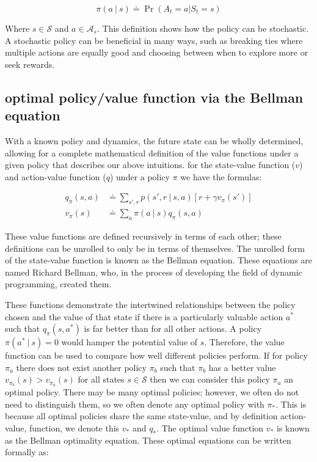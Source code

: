 \documentclass[]{final_report}
\begin{document}
\begin{equation}
  \pi(a \ |\ s) \doteq \Pr(A_t = a | S_t = s)
  \label{eqn:policy-def}
\end{equation}



Where $s \in \mathcal{S}$ and $a \in \mathcal{A}_s$. This definition shows how the policy can be stochastic. A stochastic policy can be beneficial in many ways, such as breaking ties where multiple actions are equally good and choosing between when to explore more or seek rewards. 

\subsection{optimal policy/value function via the Bellman equation}

With a known policy and dynamics, the future state can be wholly determined, allowing for a complete mathematical definition of the value functions under a given policy that describes our above intuitions. for the state-value function ($v$) and action-value function ($q$) under a policy $\pi$ we have the formulas:


\begin{align}
  q_\pi(s,a) & \doteq \sum_{s',r}p(s',r\ |\ s, a)[r + \gamma v_\pi(s')]\label{eqn:q-def} \\
  v_\pi(s)   & \doteq \sum_a \pi(a\ |\ s) q_\pi(s,a) \label{eqn:v-def}
\end{align}

These value functions are defined recursively in terms of each other; these definitions can be unrolled to only be in terms of themselves. The unrolled form of the state-value function is known as the Bellman equation. These equations are named Richard Bellman, who, in the process of developing the field of dynamic programming, created them\cite{bellman1957}.   

These functions demonstrate the intertwined relationships between the policy chosen and the value of that state if there is a particularly valuable action $a^\ast$ such that $q_\pi(s,a^\ast)$ is far better than for all other actions. A policy $\pi(a^\ast\ |\ s) = 0$ would hamper the potential value of $s$. Therefore, the value function can be used to compare how well different policies perform. If for policy $\pi_a$ there does not exist another policy $\pi_b$ such that $\pi_b$ has a better value $v_{\pi_b}(s) > v_{\pi_a}(s)$ for all states $s \in \mathcal{S}$ then we can consider this policy $\pi_a$ an optimal policy. There may be many optimal policies; however, we often do not need to distinguish them, so we often denote any optimal policy with $\pi_\ast$. This is because all optimal policies share the same state-value, and by definition action-value, function, we denote this $ v_\ast$ and $q_\ast$. The optimal value function $v_\ast$ is known as the Bellman optimality equation. These optimal equations can be written formally as:
\end{document}
